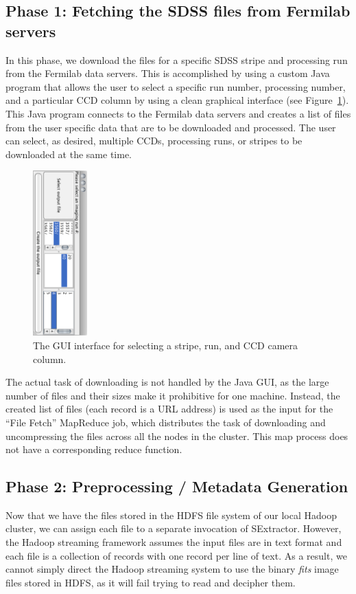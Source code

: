 \documentclass[11pt,twoside]{article}
\begin{document}
\subsection{Phase 1: Fetching the SDSS files from Fermilab servers}
In this phase, we download the files for a specific SDSS stripe and processing run from the Fermilab data servers. This is accomplished by using a custom Java program that allows the user to select a specific run number, processing number, and a particular CCD column by using a clean graphical interface (see Figure~\ref{gui}). This Java program connects to the Fermilab data servers and creates a list of files from the user specific data that are to be downloaded and processed. The user can select, as desired, multiple CCDs, processing runs, or stripes to be downloaded at the same time.


\begin{figure}[h!]
	\vspace{0in}
	\centering
	\includegraphics[height=2.5in, angle=90]{javaGui}
	\caption{The GUI interface for selecting a stripe, run, and CCD camera column.}
	\label{gui}
\end{figure}



The actual task of downloading is not handled by the Java GUI, as the large number of files and their sizes make it prohibitive for one machine. Instead, the created list of files (each record is a URL address) is used as the input for the ``File Fetch'' MapReduce job, which distributes the task of downloading and uncompressing the files across all the nodes in the cluster. 
This map process does not have a corresponding reduce function.

\subsection{Phase 2: Preprocessing / Metadata Generation}
Now that we have the files stored in the HDFS file system of our local Hadoop cluster, we can assign each file to a separate invocation of SExtractor. However, the Hadoop streaming framework assumes the input files are in text format and each file is a collection of records with one record per line of text. As a result, we cannot simply direct the Hadoop streaming system to use the binary \textit{fits} image files stored in HDFS, as it will fail trying to read and decipher them.
\end{document}
